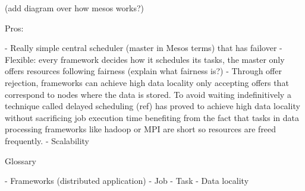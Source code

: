 (add diagram over how mesos works?)


Pros:

- Really simple central scheduler (master in Mesos terms) that has
  failover 
- Flexible: every framework decides how it schedules its tasks, the
master only offers resources following fairness (explain what fairness is?)
- Through offer rejection, frameworks can achieve high data locality
only accepting offers that correspond to nodes where the data is
stored. To avoid waiting indefinitively a technique called delayed
scheduling (ref) has proved to achieve high data locality without
sacrificing job execution time benefiting from the fact that tasks in
data processing frameworks like hadoop or MPI are short so resources
are freed frequently.
- Scalability



Glossary

- Frameworks (distributed application)
- Job
- Task
- Data locality
